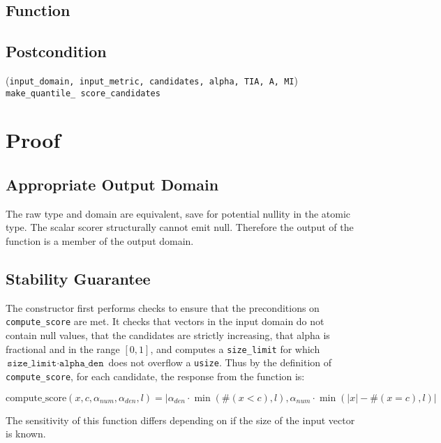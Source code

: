 \documentclass{article}
\begin{document}
\subsection*{Function}
\label{sec:python-pseudocode}



\subsection*{Postcondition}
\validTransformation
    {(\texttt{input\_domain, input\_metric, candidates, alpha, TIA, A, MI})}
    {\texttt{make\_quantile\_ score\_candidates}}

\section{Proof}
\subsection{Appropriate Output Domain}
\label{sec:approp-output-domain}
The raw type and domain are equivalent, save for potential nullity in the atomic type.
The scalar scorer structurally cannot emit null.
Therefore the output of the function is a member of the output domain.

\subsection{Stability Guarantee}

The constructor first performs checks to ensure that the preconditions on \texttt{compute\_score} are met.
It checks that vectors in the input domain do not contain null values,
that the candidates are strictly increasing,
that alpha is fractional and in the range $[0, 1]$,
and computes a \texttt{size\_limit} for which $\texttt{size\_limit} \cdot \texttt{alpha\_den}$ does not overflow a \texttt{usize}.
Thus by the definition of \texttt{compute\_score}, for each candidate, the response from the function is:

\begin{equation}
    \textrm{compute\_score}(x, c, \alpha_{num}, \alpha_{den}, l) = |\alpha_{den} \cdot \min(\#(x < c), l), \alpha_{num} \cdot \min(|x| - \#(x = c), l)|
\end{equation}

The sensitivity of this function differs depending on if the size of the input vector is known.
\end{document}
